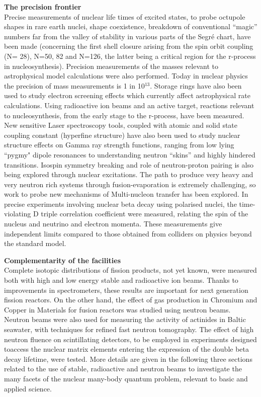 \textbf{The precision frontier}\\
Precise measurements of nuclear life times of excited states, to probe octupole shapes in rare earth nuclei, shape coexistence, breakdown of conventional “magic” numbers far from the valley of stability in various parts of the Segré chart, have been made (concerning the first shell closure arising from the spin orbit coupling (N= 28), N=50, 82 and N=126, the latter being a critical region for the r-process in nucleosynthesis). Precision measurements of the masses relevant to astrophysical model calculations were also performed. Today in nuclear physics the precision of mass measurements  is 1 in 10$^{13}$. Storage rings have also been used to study electron screening effects which currently 
affect astrophysical rate calculations. Using radioactive ion beams and an active target, reactions relevant to nucleosynthesis, from the early stage to the r-process, have been measured. New sensitive Laser spectroscopy tools, coupled with atomic and solid state coupling constant (hyperfine structure) have also been used to study nuclear structure effects on Gamma ray strength functions, ranging from low lying “pygmy" dipole resonances to understanding neutron “skins” and highly hindered transitions. 
Isospin symmetry breaking and role of neutron-proton pairing is also being explored through nuclear excitations. The path to produce very heavy and very neutron rich systems through fusion-evaporation is extremely challenging, so work to probe new mechanisms of Multi-nucleon transfer has been explored.  In precise experiments involving nuclear beta decay using polarised nuclei,  the time-violating D triple correlation coefficient were measured, relating the
spin of the nucleus and neutrino and electron momenta. These measurements give  independent limits compared to those obtained from colliders on physics beyond the standard model.

\textbf{Complementarity of the facilities}\\
Complete isotopic distributions of fission products, not yet known,  were measured both with high and low energy stable and radioactive ion beams. Thanks to improvements in spectrometers, these results are important for next generation fission reactors. On the other hand, the effect of gas production in Chromium and Copper in Materials for fusion reactors  was studied using neutron beams. Neutron beams were also used for measuring the activity of actinides in Baltic seawater, with techniques for refined fast neutron tomography. The effect of high neutron fluence on scintillating detectors, to be employed in experiments designed toaccess the nuclear matrix elements entering the expression of the double beta decay lifetime, were tested. More details are given in the following three sections related to the use of stable, radioactive and neutron beams to investigate the many facets of the nuclear many-body quantum problem, relevant to basic and applied science.


